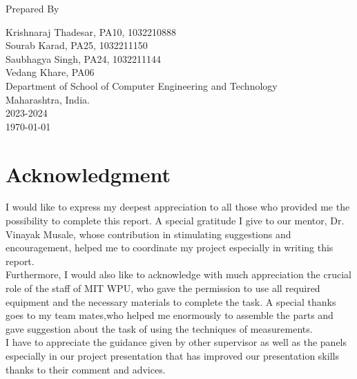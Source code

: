 \documentclass[openany]{report}
\begin{document}
\begin{titlepage}
    Prepared By
    \vspace{0.5\baselineskip} %

    \Large{
        Krishnaraj Thadesar, PA10, 1032210888\\
        Sourab Karad, PA25, 1032211150\\
        Saubhagya Singh, PA24, 1032211144\\
        Vedang Khare, PA06\\
    }
    \vspace{0.5\baselineskip} %
    \LARGE{
        Department of School of Computer Engineering and Technology\\
        Maharashtra, India.\\
        2023-2024\\
    }
    \today

\end{titlepage}


\tableofcontents
\thispagestyle{empty}
\clearpage

\chapter*{Acknowledgment}
\thispagestyle{empty}

I would like to express my deepest appreciation to all those who provided me the possibility to complete this report. A special gratitude I give to our mentor, Dr. Vinayak Musale, whose contribution in stimulating suggestions and encouragement, helped me to coordinate my project especially in writing this report.\\

Furthermore, I would also like to acknowledge with much appreciation the crucial role of the staff of MIT WPU, who gave the permission to use all required equipment and the necessary materials to complete the task. A special thanks goes to my team mates,who helped me enormously to assemble the parts and gave suggestion about the task of using the techniques of measurements.\\

I have to appreciate the guidance given by other supervisor as well as the panels especially in our project presentation that has improved our presentation skills thanks to their comment and advices.\\
\end{document}
